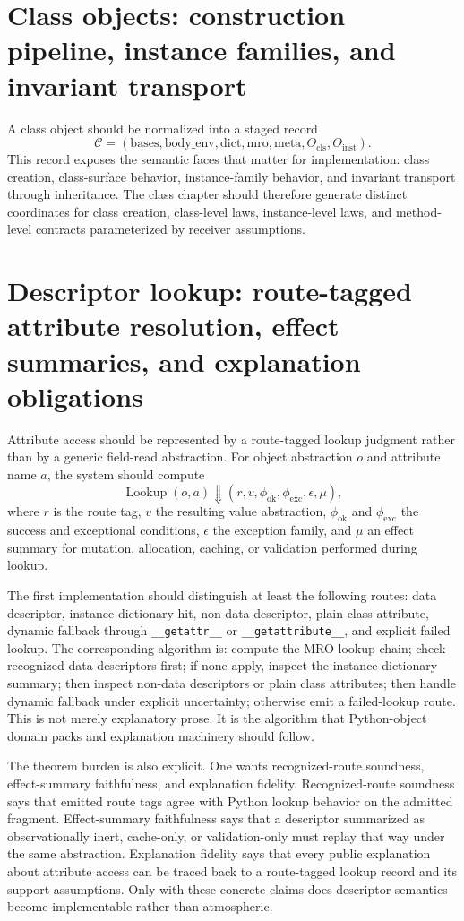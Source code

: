 \documentclass[11pt]{report}
\begin{document}
\section{Class objects: construction pipeline, instance families, and invariant transport}
A class object should be normalized into a staged record
\[
\mathcal{C} = (\mathrm{bases}, \mathrm{body\_env}, \mathrm{dict}, \mathrm{mro}, \mathrm{meta}, \Theta_{\mathrm{cls}}, \Theta_{\mathrm{inst}}).
\]
This record exposes the semantic faces that matter for implementation: class creation, class-surface behavior, instance-family behavior, and invariant transport through inheritance. The class chapter should therefore generate distinct coordinates for class creation, class-level laws, instance-level laws, and method-level contracts parameterized by receiver assumptions.

\section{Descriptor lookup: route-tagged attribute resolution, effect summaries, and explanation obligations}
Attribute access should be represented by a route-tagged lookup judgment rather than by a generic field-read abstraction. For object abstraction $o$ and attribute name $a$, the system should compute
\[
\operatorname{Lookup}(o,a) \Downarrow (r, v, \phi_{\mathrm{ok}}, \phi_{\mathrm{exc}}, \epsilon, \mu),
\]
where $r$ is the route tag, $v$ the resulting value abstraction, $\phi_{\mathrm{ok}}$ and $\phi_{\mathrm{exc}}$ the success and exceptional conditions, $\epsilon$ the exception family, and $\mu$ an effect summary for mutation, allocation, caching, or validation performed during lookup.

The first implementation should distinguish at least the following routes: data descriptor, instance dictionary hit, non-data descriptor, plain class attribute, dynamic fallback through \texttt{\_\_getattr\_\_} or \texttt{\_\_getattribute\_\_}, and explicit failed lookup. The corresponding algorithm is: compute the MRO lookup chain; check recognized data descriptors first; if none apply, inspect the instance dictionary summary; then inspect non-data descriptors or plain class attributes; then handle dynamic fallback under explicit uncertainty; otherwise emit a failed-lookup route. This is not merely explanatory prose. It is the algorithm that Python-object domain packs and explanation machinery should follow.

The theorem burden is also explicit. One wants recognized-route soundness, effect-summary faithfulness, and explanation fidelity. Recognized-route soundness says that emitted route tags agree with Python lookup behavior on the admitted fragment. Effect-summary faithfulness says that a descriptor summarized as observationally inert, cache-only, or validation-only must replay that way under the same abstraction. Explanation fidelity says that every public explanation about attribute access can be traced back to a route-tagged lookup record and its support assumptions. Only with these concrete claims does descriptor semantics become implementable rather than atmospheric.
\end{document}
